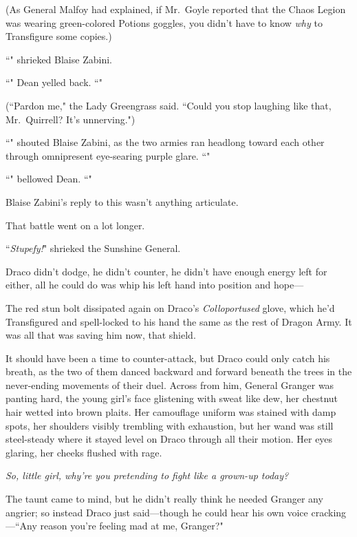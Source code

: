 (As General Malfoy had explained, if Mr.~Goyle reported that the Chaos Legion was wearing green-colored Potions goggles, you didn't have to know \emph{why} to Transfigure some copies.)

``" shrieked Blaise Zabini.

``" Dean yelled back. ``"

(``Pardon me," the Lady Greengrass said. ``Could you stop laughing like that, Mr.~Quirrell? It's unnerving.")

``" shouted Blaise Zabini, as the two armies ran headlong toward each other through omnipresent eye-searing purple glare. ``"

``" bellowed Dean. ``"

Blaise Zabini's reply to this wasn't anything articulate.

That battle went on a lot longer.

\later

``\emph{Stupefy!}" shrieked the Sunshine General.

Draco didn't dodge, he didn't counter, he didn't have enough energy left for either, all he could do was whip his left hand into position and hope—

The red stun bolt dissipated again on Draco's \emph{Colloportused} glove, which he'd Transfigured and spell-locked to his hand the same as the rest of Dragon Army. It was all that was saving him now, that shield.

It should have been a time to counter-attack, but Draco could only catch his breath, as the two of them danced backward and forward beneath the trees in the never-ending movements of their duel. Across from him, General Granger was panting hard, the young girl's face glistening with sweat like dew, her chestnut hair wetted into brown plaits. Her camouflage uniform was stained with damp spots, her shoulders visibly trembling with exhaustion, but her wand was still steel-steady where it stayed level on Draco through all their motion. Her eyes glaring, her cheeks flushed with rage.

\emph{So, little girl, why're you pretending to fight like a grown-up today?}

The taunt came to mind, but he didn't really think he needed Granger any angrier; so instead Draco just said—though he could hear his own voice cracking—``Any reason you're feeling mad at me, Granger?"

